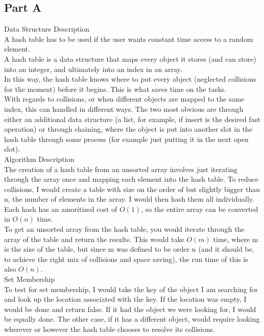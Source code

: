 \documentclass[12pt,twoside]{article}
\begin{document}
\begin{problems}

\section*{Part A}
\problem
\begin{problemparts}
\problempart Data Structure Description\\
A hash table has to be used if the user wants constant time access to a random element.\\
A hash table is a data structure that maps every object it stores (and can store) into an integer, and ultimately into an index in an array.\\

In this way, the hash table knows where to put every object (neglected collisions for the moment) before it begins.  This is what saves time on the tasks.\\

With regards to collisions, or when different objects are mapped to the same index, this can handled in different ways.  The two most obvious are through either an additional data structure (a list, for example, if insert is the desired fast operation) or through chaining, where the object is put into another slot in the hash table through some process (for example just putting it in the next open slot).\\

\problempart Algorithm Description\\
The creation of a hash table from an unsorted array involves just iterating through the array once and mapping each element into the hash table.  To reduce collisions, I would create a table with size on the order of but slightly bigger than n, the number of elements in the array.  I would then hash them all individually.  Each hash has an amoritized cost of $O(1)$, so the entire array can be converted in $O(n)$ time.\\

To get an unsorted array from the hash table, you would iterate through the array of the table and return the results.  This would take $O(m)$ time, where m is the size of the table, but since m was defined to be order n (and it should be, to achieve the right mix of collisions and space saving), the run time of this is also $O(n)$.\\

\problempart Set Membership\\
To test for set membership, I would take the key of the object I am searching for and look up the location associated with the key.  If the location was empty, I would be done and return false.  If it had the object we were looking for, I would be equally done.  The other case, if it has a different object, would require looking wherever or however the hash table chooses to resolve its collisions.  \\


\end{problemparts}
\end{problems}
\end{document}
